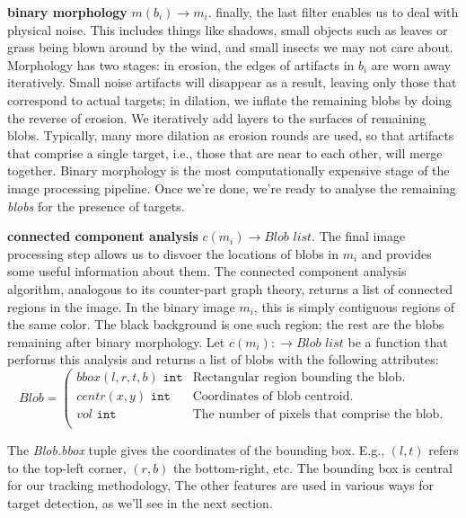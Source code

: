 \documentclass[letter]{article}
\begin{document}
 \textbf{binary morphology} $m(b_i) \rightarrow m_i$. finally, the last filter 
enables us to deal with physical noise. This includes things like shadows,
small objects such as leaves or grass being blown around by the wind, and small
insects we may not care about. Morphology has two stages: in erosion, the edges of
artifacts in $b_i$ are worn away iteratively. Small noise artifacts will disappear 
as a result, leaving only those that correspond to actual targets; in dilation, we 
inflate the remaining blobs by doing the reverse of erosion. We iteratively add layers
to the surfaces of remaining blobs. 
Typically, many more dilation as erosion rounds are used, so that artifacts that 
comprise a single target, i.e., those that are near to each other, will merge together.
Binary morphology is the most computationally expensive stage of the image processing
pipeline. Once we're done, we're ready to analyse the remaining \textit{blobs} for 
the presence of targets. 

  \textbf{connected component analysis} $c(m_i) \rightarrow \textit{Blob list}$. 
The final image processing step allows us to disvoer the locations of blobs in 
$m_i$ and provides some useful information about them. The connected component analysis
algorithm, analogous to its counter-part graph theory, returns a list of connected 
regions in the image. In the binary image $m_i$, this is simply contiguous regions
of the same color. The black background is one such region; the rest are the blobs
remaining after binary morphology. Let $c(m_i): \rightarrow \textit{Blob list}$ be a 
function that performs this analysis and returns a list of blobs with the following attributes: 
\[
 \textit{Blob} = \left (
  \begin{array}{ll}
    \textit{bbox} (l,r,t,b) \texttt{ int} & \textrm{Rectangular region bounding the blob.} \\
    \textit{centr} (x, y) \texttt{ int} &   \textrm{Coordinates of blob centroid.} \\ 
    \textit{vol} \texttt{ int} &            \textrm{The number of pixels that comprise the blob.} \\
  \end{array} \right.
\] 

The \textit{Blob.bbox} tuple gives the coordinates of the bounding box. E.g., 
$(l,t)$ refers to the top-left corner, $(r,b)$ the bottom-right, etc. The bounding box 
is central for our tracking methodology, The other features are used in various ways for 
target detection, as we'll see in the next section. 
\end{document}
